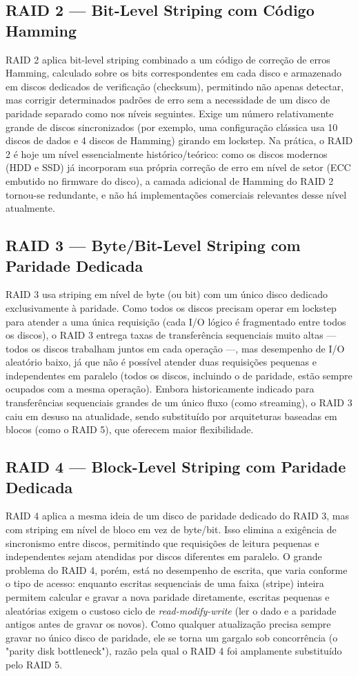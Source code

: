 \documentclass[11pt,a4paper]{article}
\begin{document}
\subsection{RAID 2 --- Bit-Level Striping com Código Hamming}
RAID 2 aplica bit-level striping combinado a um código de correção de erros Hamming, calculado sobre os bits correspondentes em cada disco e armazenado em discos dedicados de verificação (checksum), permitindo não apenas detectar, mas corrigir determinados padrões de erro sem a necessidade de um disco de paridade separado como nos níveis seguintes. Exige um número relativamente grande de discos sincronizados (por exemplo, uma configuração clássica usa 10 discos de dados e 4 discos de Hamming) girando em lockstep. Na prática, o RAID 2 é hoje um nível essencialmente histórico/teórico: como os discos modernos (HDD e SSD) já incorporam sua própria correção de erro em nível de setor (ECC embutido no firmware do disco), a camada adicional de Hamming do RAID 2 tornou-se redundante, e não há implementações comerciais relevantes desse nível atualmente.

\subsection{RAID 3 --- Byte/Bit-Level Striping com Paridade Dedicada}
RAID 3 usa striping em nível de byte (ou bit) com um único disco dedicado exclusivamente à paridade. Como todos os discos precisam operar em lockstep para atender a uma única requisição (cada I/O lógico é fragmentado entre todos os discos), o RAID 3 entrega taxas de transferência sequenciais muito altas --- todos os discos trabalham juntos em cada operação ---, mas desempenho de I/O aleatório baixo, já que não é possível atender duas requisições pequenas e independentes em paralelo (todos os discos, incluindo o de paridade, estão sempre ocupados com a mesma operação). Embora historicamente indicado para transferências sequenciais grandes de um único fluxo (como streaming), o RAID 3 caiu em desuso na atualidade, sendo substituído por arquiteturas baseadas em blocos (como o RAID 5), que oferecem maior flexibilidade.

\subsection{RAID 4 --- Block-Level Striping com Paridade Dedicada}
RAID 4 aplica a mesma ideia de um disco de paridade dedicado do RAID 3, mas com striping em nível de bloco em vez de byte/bit. Isso elimina a exigência de sincronismo entre discos, permitindo que requisições de leitura pequenas e independentes sejam atendidas por discos diferentes em paralelo. O grande problema do RAID 4, porém, está no desempenho de escrita, que varia conforme o tipo de acesso: enquanto escritas sequenciais de uma faixa (stripe) inteira permitem calcular e gravar a nova paridade diretamente, escritas pequenas e aleatórias exigem o custoso ciclo de \textit{read-modify-write} (ler o dado e a paridade antigos antes de gravar os novos). Como qualquer atualização precisa sempre gravar no único disco de paridade, ele se torna um gargalo sob concorrência (o "parity disk bottleneck"), razão pela qual o RAID 4 foi amplamente substituído pelo RAID 5.
\end{document}
